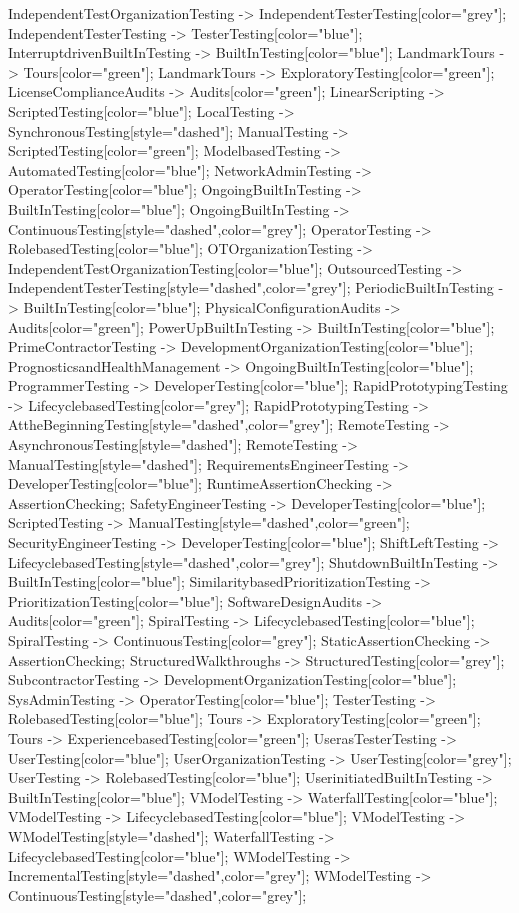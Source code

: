 \documentclass{article}
\begin{document}
{IndependentTestOrganizationTesting -> IndependentTesterTesting[color="grey"];
IndependentTesterTesting -> TesterTesting[color="blue"];
InterruptdrivenBuiltInTesting -> BuiltInTesting[color="blue"];
LandmarkTours -> Tours[color="green"];
LandmarkTours -> ExploratoryTesting[color="green"];
LicenseComplianceAudits -> Audits[color="green"];
LinearScripting -> ScriptedTesting[color="blue"];
LocalTesting -> SynchronousTesting[style="dashed"];
ManualTesting -> ScriptedTesting[color="green"];
ModelbasedTesting -> AutomatedTesting[color="blue"];
NetworkAdminTesting -> OperatorTesting[color="blue"];
OngoingBuiltInTesting -> BuiltInTesting[color="blue"];
OngoingBuiltInTesting -> ContinuousTesting[style="dashed",color="grey"];
OperatorTesting -> RolebasedTesting[color="blue"];
OTOrganizationTesting -> IndependentTestOrganizationTesting[color="blue"];
OutsourcedTesting -> IndependentTesterTesting[style="dashed",color="grey"];
PeriodicBuiltInTesting -> BuiltInTesting[color="blue"];
PhysicalConfigurationAudits -> Audits[color="green"];
PowerUpBuiltInTesting -> BuiltInTesting[color="blue"];
PrimeContractorTesting -> DevelopmentOrganizationTesting[color="blue"];
PrognosticsandHealthManagement -> OngoingBuiltInTesting[color="blue"];
ProgrammerTesting -> DeveloperTesting[color="blue"];
RapidPrototypingTesting -> LifecyclebasedTesting[color="grey"];
RapidPrototypingTesting -> AttheBeginningTesting[style="dashed",color="grey"];
RemoteTesting -> AsynchronousTesting[style="dashed"];
RemoteTesting -> ManualTesting[style="dashed"];
RequirementsEngineerTesting -> DeveloperTesting[color="blue"];
RuntimeAssertionChecking -> AssertionChecking;
SafetyEngineerTesting -> DeveloperTesting[color="blue"];
ScriptedTesting -> ManualTesting[style="dashed",color="green"];
SecurityEngineerTesting -> DeveloperTesting[color="blue"];
ShiftLeftTesting -> LifecyclebasedTesting[style="dashed",color="grey"];
ShutdownBuiltInTesting -> BuiltInTesting[color="blue"];
SimilaritybasedPrioritizationTesting -> PrioritizationTesting[color="blue"];
SoftwareDesignAudits -> Audits[color="green"];
SpiralTesting -> LifecyclebasedTesting[color="blue"];
SpiralTesting -> ContinuousTesting[color="grey"];
StaticAssertionChecking -> AssertionChecking;
StructuredWalkthroughs -> StructuredTesting[color="grey"];
SubcontractorTesting -> DevelopmentOrganizationTesting[color="blue"];
SysAdminTesting -> OperatorTesting[color="blue"];
TesterTesting -> RolebasedTesting[color="blue"];
Tours -> ExploratoryTesting[color="green"];
Tours -> ExperiencebasedTesting[color="green"];
UserasTesterTesting -> UserTesting[color="blue"];
UserOrganizationTesting -> UserTesting[color="grey"];
UserTesting -> RolebasedTesting[color="blue"];
UserinitiatedBuiltInTesting -> BuiltInTesting[color="blue"];
VModelTesting -> WaterfallTesting[color="blue"];
VModelTesting -> LifecyclebasedTesting[color="blue"];
VModelTesting -> WModelTesting[style="dashed"];
WaterfallTesting -> LifecyclebasedTesting[color="blue"];
WModelTesting -> IncrementalTesting[style="dashed",color="grey"];
WModelTesting -> ContinuousTesting[style="dashed",color="grey"];

}
\end{document}
